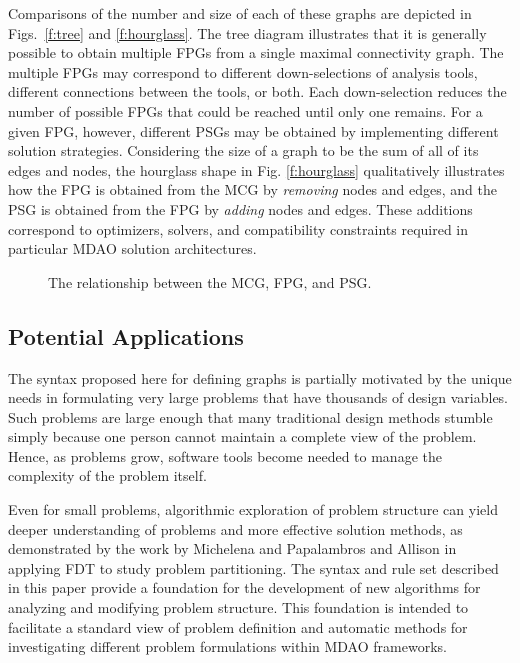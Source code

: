  Comparisons of the number and size of each of these graphs are depicted in Figs.~\ref{f:tree} and \ref{f:hourglass}.
  The tree diagram illustrates that it is generally possible to obtain
  multiple FPGs from a single maximal connectivity graph. The multiple FPGs may correspond to
  different down-selections of analysis tools, different connections between the tools,
  or both. Each down-selection reduces the number of possible FPGs that could be reached
  until only one remains. For a given FPG, however, different PSGs may be obtained by implementing
  different solution strategies. Considering the size of a graph to be the sum of all of its
  edges and nodes, the hourglass shape in Fig. \ref{f:hourglass} qualitatively illustrates how
  the FPG is obtained from the MCG by \emph{removing} nodes and edges,
  and the PSG is obtained from the FPG by \emph{adding} nodes and edges.
These additions correspond to optimizers, solvers, and compatibility constraints required in particular MDAO solution architectures.
\begin{figure}[htb!]
    \centering
  \caption{The relationship between the MCG, FPG, and PSG.}
  \end{figure}

\subsection{Potential Applications}

The syntax proposed here for defining graphs is partially motivated by the unique needs
in formulating very large problems that have thousands of design variables. Such problems are
large enough that many traditional design methods stumble simply because one person cannot maintain a complete view of the problem. Hence, as problems
grow, software tools become needed to manage the complexity of the problem itself.

Even for small problems, algorithmic exploration of problem structure can yield deeper understanding
of problems and more effective solution methods, as demonstrated by the work by Michelena and Papalambros \cite{Michelena1997} and Allison \cite{Allison2008} in applying FDT to study problem partitioning. The syntax and rule set described
in this paper
provide a foundation for the development of new algorithms for analyzing and modifying
problem structure. This foundation is intended to facilitate a standard view of
problem definition and automatic methods for investigating different  problem formulations within MDAO frameworks.

